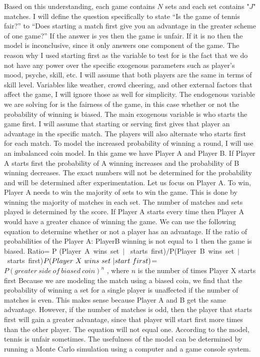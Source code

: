 \documentclass[12pt]{article}
\begin{document}
Based on this understanding, each game contains $N$  sets and each set contains "$J$" matches.  I will define the question specifically to state “Is the game of tennis fair?” to “Does starting a match first give you an advantage in the greater scheme of one game?” If the answer is yes then the game is unfair. If it is no then the model is inconclusive, since it only answers one component of the game. The reason why I used starting first as the variable to test for is the fact that we do not have any power over the specific exogenous parameters such as player’s mood, psyche, skill, etc. I will assume that both players are the same in terms of skill level. Variables like weather, crowd cheering, and other external factors that affect the game, I will ignore those as well for simplicity. The endogenous variable we are solving for is the fairness of the game, in this case whether or not the probability of winning is biased. The main exogenous variable is who starts the game first. 
\newline
I will assume that starting or serving first gives that player an advantage in the specific match. The players will also alternate who starts first for each match. To model the increased probability of winning a round, I will use an imbalanced coin model. In this game we have Player A and Player B. If Player A starts first the probability of A winning increases and the probability of B winning decreases. The exact numbers will not be determined for the probability and will be determined after experimentation. 
\newline
Let us focus on Player A. To win, Player A needs to win the majority of sets to win the game. This is done by winning the majority of matches in each set. The number of matches and sets played is determined by the score. If Player A starts every time then Player A would have a greater chance of winning the game. We can use the following equation to determine whether or not a player has an advantage. If the ratio of probabilities of the Player A:  PlayerB winning is not equal to 1 then the game is biased. 
\newline
 Ratio= P (Player~A~wins~set~$|$~ starts~first)$/$P(Player~B~wins~set~$|$ ~starts~first)$
\newline
 P(Player~X~wins~set~| start~first)$=$ P(greater~side~of~biased~coin)^n$ , where $n$ is the number of times Player X starts first\newline
\newline
Because we are modeling the match using a biased coin, we find that the probability of winning a set for a single player is unaffected if the number of matches is even. This makes sense because Player A and B get the same advantage. However, if the number of matches is odd, then the player that starts first will gain a greater advantage, since that player will start first more times than the other player. The equation will not equal one. \newline
\newline
According to the model, tennis is unfair sometimes. The usefulness of the model can be determined by running a Monte Carlo simulation using a computer and a game console system. 
\end{document}
